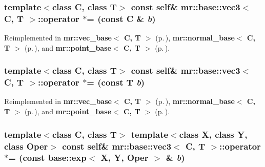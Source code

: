 \subsubsection{\setlength{\rightskip}{0pt plus 5cm}template$<$class C, class T$>$ const {\bf self}\& {\bf mr::base::vec3}$<$ C, T $>$::operator $\ast$= (const C \& {\em b})\hspace{0.3cm}{\tt  [inline]}}\label{structmr_1_1base_1_1vec3_z40_8}




Reimplemented in {\bf mr::vec\_\-base$<$ C, T $>$} {\rm (p.\,\pageref{structmr_1_1vec__base_z64_1})}, {\bf mr::normal\_\-base$<$ C, T $>$} {\rm (p.\,\pageref{structmr_1_1normal__base_z71_1})}, and {\bf mr::point\_\-base$<$ C, T $>$} {\rm (p.\,\pageref{structmr_1_1point__base_z78_1})}.
\subsubsection{\setlength{\rightskip}{0pt plus 5cm}template$<$class C, class T$>$ const {\bf self}\& {\bf mr::base::vec3}$<$ C, T $>$::operator $\ast$= (const T {\em b})\hspace{0.3cm}{\tt  [inline]}}\label{structmr_1_1base_1_1vec3_z40_7}




Reimplemented in {\bf mr::vec\_\-base$<$ C, T $>$} {\rm (p.\,\pageref{structmr_1_1vec__base_z64_0})}, {\bf mr::normal\_\-base$<$ C, T $>$} {\rm (p.\,\pageref{structmr_1_1normal__base_z71_0})}, and {\bf mr::point\_\-base$<$ C, T $>$} {\rm (p.\,\pageref{structmr_1_1point__base_z78_0})}.
\subsubsection{\setlength{\rightskip}{0pt plus 5cm}template$<$class C, class T$>$ template$<$class X, class Y, class Oper$>$ const {\bf self}\& {\bf mr::base::vec3}$<$ C, T $>$::operator $\ast$= (const {\bf base::exp}$<$ X, Y, Oper $>$ \& {\em b})\hspace{0.3cm}{\tt  [inline]}}\label{structmr_1_1base_1_1vec3_z40_6}


